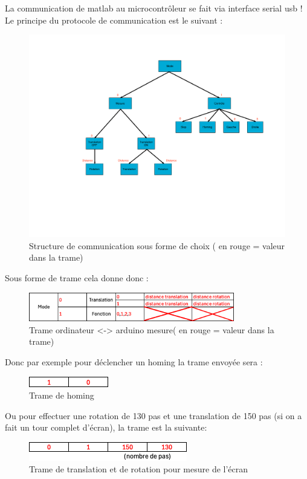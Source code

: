 La communication de matlab au microcontrôleur se fait via interface serial usb !
Le principe du protocole de communication est le suivant :
\begin{figure}[H]
    \centering
    \includegraphics[page = 1, width = \textwidth, trim = {7cm 9cm 2cm 3cm},clip]{assets/figures/ameliorations/trame_comm.pdf}
    \caption[Structure de communication]{Structure de communication sous forme de choix ( en \color{red} rouge \color{black} = valeur dans la trame)}
\end{figure}
Sous forme de trame cela donne donc :
\begin{figure}[H]
    \centering
    \includegraphics[width = 0.8\textwidth]{assets/figures/ameliorations/trame comm.png}
    \caption[Trame ordinateur <-> arduino mesure]{Trame ordinateur <-> arduino mesure( en \color{red} rouge \color{black} = valeur dans la trame)}
\end{figure}

Donc par exemple pour déclencher un homing la trame envoyée sera :
\begin{figure}[H]
    \centering
    \includegraphics[scale = 1.3]{assets/figures/ameliorations/trame_homing.png}
    \caption[Trame homing]{Trame de homing}
\end{figure}
Ou pour effectuer une rotation de 130 pas et une translation de 150 pas (si on a fait un tour complet d'écran), la trame est la suivante:
\begin{figure}[H]
    \centering
    \includegraphics[scale = 1.3]{assets/figures/ameliorations/trame_translation_rotation.png}
    \caption[Trame translation rotation]{Trame de translation et de rotation pour mesure de l'écran\label{fig:trame_trans_rota}}
\end{figure}

